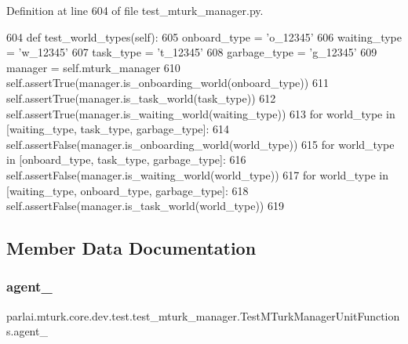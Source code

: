 Definition at line 604 of file test\+\_\+mturk\+\_\+manager.\+py.


\begin{DoxyCode}
604     \textcolor{keyword}{def }test\_world\_types(self):
605         onboard\_type = \textcolor{stringliteral}{'o\_12345'}
606         waiting\_type = \textcolor{stringliteral}{'w\_12345'}
607         task\_type = \textcolor{stringliteral}{'t\_12345'}
608         garbage\_type = \textcolor{stringliteral}{'g\_12345'}
609         manager = self.mturk\_manager
610         self.assertTrue(manager.is\_onboarding\_world(onboard\_type))
611         self.assertTrue(manager.is\_task\_world(task\_type))
612         self.assertTrue(manager.is\_waiting\_world(waiting\_type))
613         \textcolor{keywordflow}{for} world\_type \textcolor{keywordflow}{in} [waiting\_type, task\_type, garbage\_type]:
614             self.assertFalse(manager.is\_onboarding\_world(world\_type))
615         \textcolor{keywordflow}{for} world\_type \textcolor{keywordflow}{in} [onboard\_type, task\_type, garbage\_type]:
616             self.assertFalse(manager.is\_waiting\_world(world\_type))
617         \textcolor{keywordflow}{for} world\_type \textcolor{keywordflow}{in} [waiting\_type, onboard\_type, garbage\_type]:
618             self.assertFalse(manager.is\_task\_world(world\_type))
619 
\end{DoxyCode}


\subsection{Member Data Documentation}
\mbox{\label{classparlai_1_1mturk_1_1core_1_1dev_1_1test_1_1test__mturk__manager_1_1TestMTurkManagerUnitFunctions_a0ddc7e52e532e3d6066e357237af8884}} 
\subsubsection{\texorpdfstring{agent\+\_}{agent\_1}}
{\footnotesize\ttfamily parlai.\+mturk.\+core.\+dev.\+test.\+test\+\_\+mturk\+\_\+manager.\+Test\+M\+Turk\+Manager\+Unit\+Functions.\+agent\+\_}



